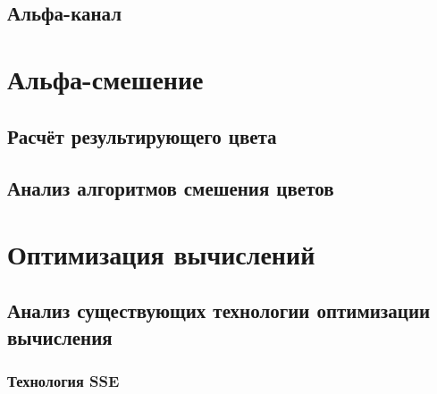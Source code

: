 \begin{figure}[ht!]
\end{figure}

\subsection{Альфа-канал}

\section{Альфа-смешение}

\subsection{Расчёт результирующего цвета}

\subsection{Анализ  алгоритмов смешения цветов}
\subsection{}
\section{Оптимизация вычислений}
\subsection{Анализ существующих технологии оптимизации вычисления}
\subsubsection{Технология SSE}
